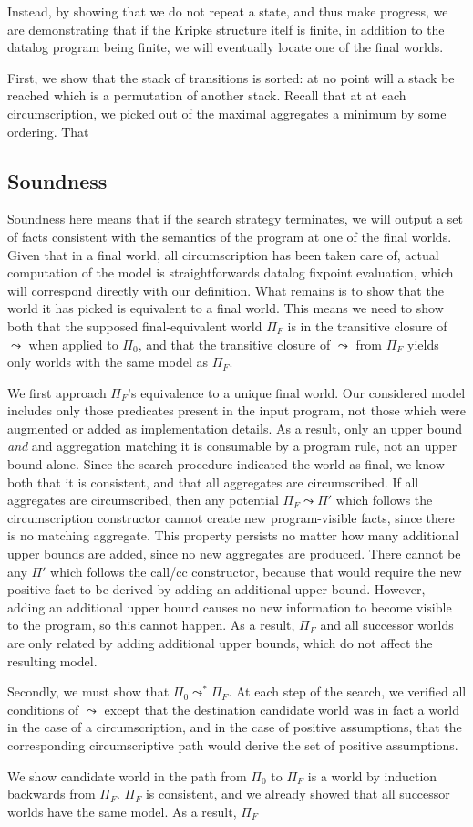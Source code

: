 Instead, by showing that we do not repeat a state, and thus make progress, we are demonstrating that if the Kripke structure itelf is finite, in addition to the datalog program being finite, we will eventually locate one of the final worlds.

First, we show that the stack of transitions is sorted: at no point will a stack be reached which is a permutation of another stack.
Recall that at at each circumscription, we picked out of the maximal aggregates a minimum by some ordering.
That 
\subsection{Soundness}
\label{sec:soundness}
Soundness here means that if the search strategy terminates, we will output a set of facts consistent with the semantics of the program at one of the final worlds.
Given that in a final world, all circumscription has been taken care of, actual computation of the model is straightforwards datalog fixpoint evaluation, which will correspond directly with our definition.
What remains is to show that the world it has picked is equivalent to a final world.
This means we need to show both that the supposed final-equivalent world $\Pi_F$ is in the transitive closure of $\leadsto$ when applied to $\Pi_0$, and that the transitive closure of $\leadsto$ from $\Pi_F$ yields only worlds with the same model as $\Pi_F$.

We first approach $\Pi_F$'s equivalence to a unique final world.
Our considered model includes only those predicates present in the input program, not those which were augmented or added as implementation details.
As a result, only an upper bound \emph{and} and aggregation matching it is consumable by a program rule, not an upper bound alone.
Since the search procedure indicated the world as final, we know both that it is consistent, and that all aggregates are circumscribed.
If all aggregates are circumscribed, then any potential $\Pi_F \leadsto \Pi'$ which follows the circumscription constructor cannot create new program-visible facts, since there is no matching aggregate.
This property persists no matter how many additional upper bounds are added, since no new aggregates are produced.
There cannot be any $\Pi'$ which follows the call/cc constructor, because that would require the new positive fact to be derived by adding an additional upper bound.
However, adding an additional upper bound causes no new information to become visible to the program, so this cannot happen.
As a result, $\Pi_F$ and all successor worlds are only related by adding additional upper bounds, which do not affect the resulting model.

Secondly, we must show that $\Pi_0 \leadsto^* \Pi_F$.
At each step of the search, we verified all conditions of $\leadsto$ except that the destination candidate world was in fact a world in the case of a circumscription, and in the case of positive assumptions, that the corresponding circumscriptive path would derive the set of positive assumptions.

We show candidate world in the path from $\Pi_0$ to $\Pi_F$ is a world by induction backwards from $\Pi_F$.
$\Pi_F$ is consistent, and we already showed that all successor worlds have the same model.
As a result, $\Pi_F$
